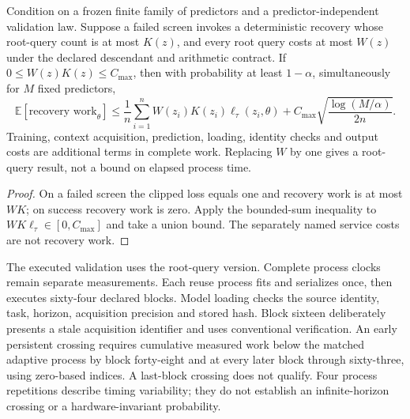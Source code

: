 \begin{proposition}\label{prop:complete-work69}
Condition on a frozen finite family of predictors and a predictor-independent validation law. Suppose a failed screen invokes a deterministic recovery whose root-query count is at most $K(z)$, and every root query costs at most $W(z)$ under the declared descendant and arithmetic contract. If $0\le W(z)K(z)\le C_{\max}$, then with probability at least $1-\alpha$, simultaneously for $M$ fixed predictors,
\[
 \mathbb E[\text{recovery work}_\theta]
 \le\frac1n\sum_{i=1}^n W(z_i)K(z_i)\ell_\tau(z_i,\theta)
       +C_{\max}\sqrt{\frac{\log(M/\alpha)}{2n}}.
\]
Training, context acquisition, prediction, loading, identity checks and output costs are additional terms in complete work. Replacing $W$ by one gives a root-query result, not a bound on elapsed process time.
\end{proposition}
\begin{proof}
On a failed screen the clipped loss equals one and recovery work is at most $WK$; on success recovery work is zero. Apply the bounded-sum inequality to $WK\ell_\tau\in[0,C_{\max}]$ and take a union bound. The separately named service costs are not recovery work.
\end{proof}

The executed validation uses the root-query version. Complete process clocks remain separate measurements. Each reuse process fits and serializes once, then executes sixty-four declared blocks. Model loading checks the source identity, task, horizon, acquisition precision and stored hash. Block sixteen deliberately presents a stale acquisition identifier and uses conventional verification. An early persistent crossing requires cumulative measured work below the matched adaptive process by block forty-eight and at every later block through sixty-three, using zero-based indices. A last-block crossing does not qualify. Four process repetitions describe timing variability; they do not establish an infinite-horizon crossing or a hardware-invariant probability.

